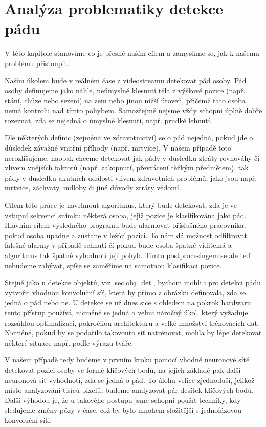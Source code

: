 \chapter{Analýza problematiky detekce pádu}
\label{chap:Goal}

V této kapitole stanovíme co je přesně naším cílem a zamyslíme se, jak k našemu
problému přistoupit.

Naším úkolem bude v reálném čase z videostreamu detekovat pád osoby. Pád osoby
definujeme jako náhle, neúmyslné klesnutí těla z výškové pozice (např. stání,
chůze nebo sezení) na zem nebo jinou nižší úroveň, přičemž tato osoba nemá
kontrolu nad tímto pohybem. Samozřejmě nejsme vždy schopni úplně dobře
rozeznat, zda se nejedná o úmyslné klesnutí, např. prudké lehnutí.

Dle některých definic (zejména ve zdravotnictví) se o pád nejedná, pokud jde o
důsledek závažné vnitřní příhody (např. mrtvice). V našem případě toto
nerozlišujeme, naopak chceme detekovat jak pády v důsledku ztráty rovnováhy či
vlivem vnějších faktorů (např. zakopnutí, převrácení těžkým předmětem), tak
pády v důsledku akutních události vlivem zdravotních problémů, jako jsou např.
mrtvice, záchvaty, mdloby či jiné důvody ztráty vědomí.

Cílem této práce je navrhnout algoritmus, který bude detekovat, zda je ve
vstupní sekvenci snímku některá osoba, jejíž pozice je klasifikována jako pád.
Hlavním cílem výsledného programu bude alarmovat příslušného pracovníka, pokud
osoba upadne a zůstane v ležící pozici. To nám dá možnost odfiltrovat falešné
alarmy v případě sehnutí čí pokud bude osoba špatně viditelná a algoritmus tak
špatně vyhodnotí její pohyb. Tímto postprocesingem se ale teď nebudeme zabývat,
spíše se zaměříme na samotnou klasifikaci pozice.

Stejně jako u detekce objektů, viz \ref{sec:obj_det}, bychom mohli i pro
detekci pádu vytvořit vhodnou konvoluční síť, která by přímo z obrázku
definovala, zda se jedná o pád nebo ne. U detekce se už dnes sice s ohledem na
pokrok hardwaru tento přístup používá, nicméně se jedná o velmi náročný úkol,
který vyžaduje rozsáhlou optimalizaci, pokročilou architekturu a velké množství
trénovacích dat. Nicméně, pokud by se podařilo takovouto síť natrénovat, mohla
by lépe detekovat některé situace např. podle výrazu tváře.

V našem případě tedy budeme v prvním kroku pomocí vhodné neuronové sítě
detekovat pozici osoby ve formě klíčových bodů, na jejich základě pak další
neuronová síť vyhodnotí, zda se jedná o pád. To úlohu velice zjednoduší,
jelikož místo analyzování tisíců pixelů, budeme analyzovat pár desítek
klíčových bodů. Další výhodou je, že u takového postupu jsme schopní použít
techniky, kdy sledujeme změny pózy v čase, což by bylo mnohem složitější s
jednofázovou konvoluční síti.

